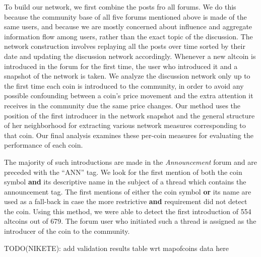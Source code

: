 To build our network, we first combine the posts fro all forums. We do this because the community base of all five forums mentioned above is made of the same users, and because we are mostly concerned about influence and aggregate information flow among users, rather than the exact topic of the discussion.
The network construction involves replaying all the posts over time sorted by their date and updating the
discussion network accordingly. Whenever a new altcoin is introduced
in the forum for the first time, the user who introduced it and a snapshot of the network is taken. 
We analyze the discussion network only up to the first time each coin is introduced to the community, in order to avoid any possible confounding between a coin's price movement and the extra attention it receives in the community due the same price changes. Our method uses the position of the first introducer in the network snapshot and the general structure of her neighborhood for extracting various network measures corresponding to that coin. Our final analysis examines these per-coin measures for evaluating the performance of each coin.



The  majority of such introductions are made in the \textit{Announcement} forum and are preceded with the ``ANN'' tag. We look for the first mention of both the coin symbol \textbf{and} its descriptive name in the subject of a thread which contains the announcement tag. The first mentions of either the coin symbol \textbf{or} its name are used as a fall-back in case the more restrictive \textbf{and} requirement did not detect the coin. 
Using this method, we were able to detect the first introduction of 554 altcoins out of 679.
The forum user who initiated such a thread is assigned as the introducer of the coin to the community.

TODO(NIKETE): add validation results table wrt mapofcoins data here

